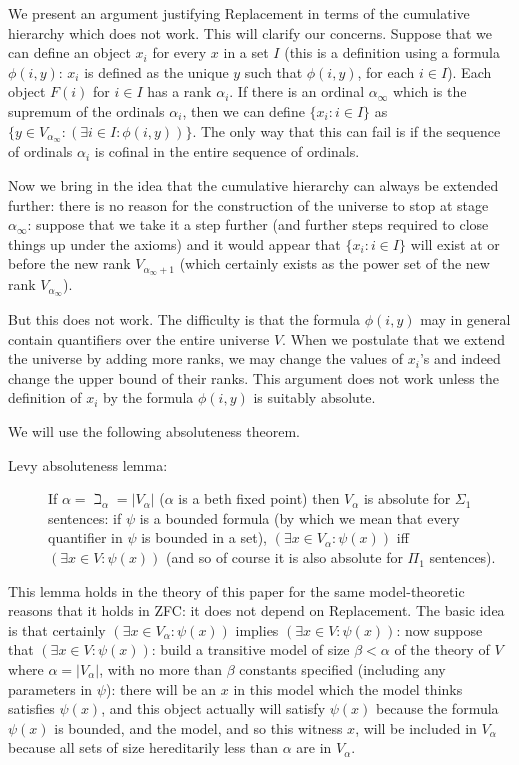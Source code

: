 \documentclass[12pt]{article}
\begin{document}
We present an argument justifying Replacement in terms of the cumulative hierarchy which does not work.  This will clarify our concerns.
Suppose that we can define an object $x_i$ for every $x$ in a set $I$ (this is a definition using a formula $\phi(i,y)$:  $x_i$ is defined as the unique $y$ such that $\phi(i,y)$, for each $i \in I$).  Each object $F(i)$ for $i \in I$ has a rank $\alpha_i$.   If there is an ordinal $\alpha_{\infty}$ which is the supremum of the ordinals $\alpha_i$, then we can define $\{x_i:i \in I\}$ as $\{y \in V_{\alpha_{\infty}}:(\exists i \in I:\phi(i,y))\}$.  The only way that this can fail
is if the sequence of ordinals $\alpha_i$ is cofinal in the entire sequence of ordinals.

Now we bring in the idea that the cumulative hierarchy can always be extended further:  there is no reason for the construction of the universe to stop at stage $\alpha_{\infty}$:  suppose that we take it a step further (and further steps required to close things up under the axioms) and it would appear
that $\{x_i:i \in I\}$ will exist at or before the new rank $V_{\alpha_{\infty}+1}$ (which certainly exists as the power set of the new rank $V_{\alpha_{\infty}}$).

But this does not work.  The difficulty is that the formula $\phi(i,y)$ may in general contain quantifiers over the entire universe $V$.  When we postulate that we extend the universe by adding more ranks, we may change the values of $x_i$'s and indeed change the upper bound of their ranks.  This argument does not work unless the definition of $x_i$ by the formula $\phi(i,y)$ is suitably absolute.

We will use the following absoluteness theorem.

\begin{description}

\item[Levy absoluteness lemma:]  If $\alpha = \beth_{\alpha} = |V_{\alpha}|$ ($\alpha$ is a beth fixed point) then $V_{\alpha}$ is absolute for $\Sigma_1$ sentences:  if $\psi$ is a bounded formula (by which we mean that every quantifier in $\psi$ is bounded in a set), $(\exists x \in V_{\alpha}:\psi(x))$ iff $(\exists x \in V:\psi(x))$ (and so of course it is also absolute for $\Pi_1$ sentences).

\end{description}

This lemma holds in the theory of this paper for the same model-theoretic reasons that it holds in ZFC:  it does not depend on Replacement.  The basic idea is that certainly $(\exists x \in V_{\alpha}:\psi(x))$ implies $(\exists x \in V:\psi(x))$:  now suppose that $(\exists x \in V:\psi(x))$:  build a transitive model of size $\beta<\alpha$ of the theory of $V$ where $\alpha=|V_{\alpha}|$, with no more than $\beta$ constants specified (including any parameters in $\psi$):  there will be an $x$ in this model which the model thinks satisfies $\psi(x)$, and this object actually will satisfy $\psi(x)$ because the formula $\psi(x)$ is bounded, and the model, and so this witness $x$, will be included in $V_{\alpha}$ because all sets of size hereditarily less than $\alpha$ are in $V_{\alpha}$.
\end{document}
